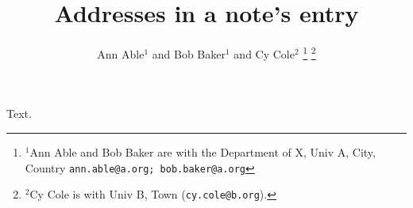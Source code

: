 \documentclass{article}
\begin{document}
\title{Addresses in a note's entry}
\author{Ann Able$^{1}$ and Bob Baker$^{1}$ and Cy Cole$^{2}$%
\thanks{$^{1}$Ann Able and Bob Baker are with the Department of X, Univ A, City, Country {\tt\small ann.able@a.org; bob.baker@a.org}}%
\thanks{$^{2}$Cy Cole is with Univ B, Town ({\tt\small cy.cole@b.org}).}}
\maketitle
Text.
\end{document}
